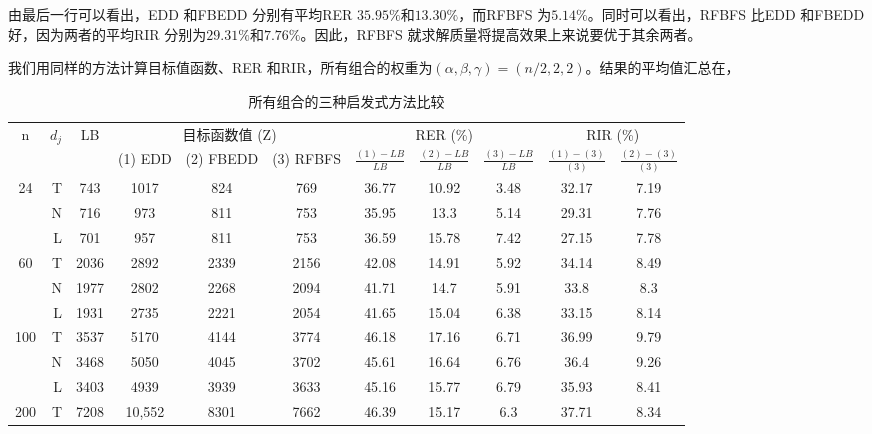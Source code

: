 由最后一行可以看出，EDD 和FBEDD 分别有平均RER $35.95\%\text{和}13.30\%$，而RFBFS 为$5.14\%$。同时可以看出，RFBFS 比EDD 和FBEDD 好，因为两者的平均RIR 分别为$29.31\%\text{和}7.76\%$。因此，RFBFS 就求解质量将提高效果上来说要优于其余两者。

我们用同样的方法计算目标值函数、RER 和RIR，所有组合的权重为$(\alpha,\beta,\gamma) = (n/2,2,2)$。结果的平均值汇总在，
\begin{table}[h]
  \centering\xiaowu
  \caption{所有组合的三种启发式方法比较\label{tab:allcompare}}
    \begin{tabular}{crccccccccc}
    \toprule
    \multirow{2}[4]{*}{n} & \multicolumn{1}{c}{\multirow{2}[4]{*}{$d_j$}} & \multirow{2}[4]{*}{LB} & \multicolumn{3}{c}{目标函数值 (Z)} & \multicolumn{3}{c}{RER (\%)} & \multicolumn{2}{c}{RIR (\%)} \\
    \cmidrule(lr){4-6}\cmidrule(lr){7-9}\cmidrule(lr){10-11}
          & \multicolumn{1}{c}{} &       & (1) EDD & (2) FBEDD & (3) RFBFS &\parbox[c][8mm]{0pt}{} $\frac{(1) - LB}{LB}$ & $\frac{(2) - LB}{LB}$ & $\frac{(3) - LB}{LB}$ &$\frac{(1) - (3)}{(3)}$ & $\frac{(2) - (3)}{(3)}$\\
      \midrule    
    [1]{*}{24} & T     & 743   & 1017  & 824   & 769   & 36.77 & 10.92 & 3.48  & 32.17 & 7.19 \\
          & N     & 716   & 973   & 811   & 753   & 35.95 & 13.3  & 5.14  & 29.31 & 7.76 \\
          & L     & 701   & 957   & 811   & 753   & 36.59 & 15.78 & 7.42  & 27.15 & 7.78 \\[3pt]
    [0]{*}{60} & T     & 2036  & 2892  & 2339  & 2156  & 42.08 & 14.91 & 5.92  & 34.14 & 8.49 \\
          & N     & 1977  & 2802  & 2268  & 2094  & 41.71 & 14.7  & 5.91  & 33.8  & 8.3 \\
          & L     & 1931  & 2735  & 2221  & 2054  & 41.65 & 15.04 & 6.38  & 33.15 & 8.14 \\[3pt]
    [0]{*}{100} & T     & 3537  & 5170  & 4144  & 3774  & 46.18 & 17.16 & 6.71  & 36.99 & 9.79 \\
          & N     & 3468  & 5050  & 4045  & 3702  & 45.61 & 16.64 & 6.76  & 36.4  & 9.26 \\
          & L     & 3403  & 4939  & 3939  & 3633  & 45.16 & 15.77 & 6.79  & 35.93 & 8.41 \\[3pt]
    [0]{*}{200} & T     & 7208  & 10,552 & 8301  & 7662  & 46.39 & 15.17 & 6.3   & 37.71 & 8.34 \\

\end{tabular}
\end{table}
